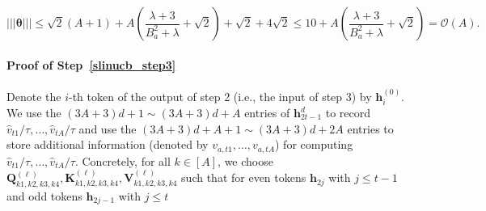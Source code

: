 \documentclass[10pt]{article}
\renewcommand{\hat}{\widehat}
\renewcommand{\cO}{\mathcal{O}}
\newcommand{\<}{\left\langle}
\renewcommand{\>}{\right\rangle}
\renewcommand{\bQ}{\mathbf{Q}}
\newcommand{\nrmp}[1]{{\left|\!\left|\!\left|{#1}\right|\!\right|\!\right|}}
\newcommand{\partd}{{d}}
\newcommand{\temp}{{\tau}}
\def\bK{{\mathbf K}}
\def\bQ{{\mathbf Q}}
\def\bV{{\mathbf V}}
\def\btheta{{\boldsymbol \theta}}
\def\bh{{\mathbf h}}
\begin{document}
$$
\nrmp{\btheta}\leq \sqrt{2}(A+1)+A(\frac{\lambda+3}{B_a^2+\lambda}+\sqrt{2})+\sqrt{2}+4\sqrt{2}\leq 10+A(\frac{\lambda+3}{B_a^2+\lambda}+\sqrt{2})=\cO(A).$$
\paragraph{Proof of Step~\ref{slinucb_step3}}
Denote the $i$-th token  of the output of step 2 (i.e., the input of step 3) by $\bh_i^{(0)}$.
We use the $(3A+3)d+1\sim (3A+3)d+A $ entries of $\bh_{2t-1}^{\partd}$ to record $\hat v_{t1}/\temp,\ldots,\hat v_{tA}/\temp$ and  use the $(3A+3)d+A+1\sim (3A+3)d+2A $ entries to store additional information (denoted by $ v_{a,t1},\ldots, v_{a,tA}$) for computing $ \hat v_{t1}/\temp,\ldots, \hat  v_{tA}/\temp$. Concretely, for all $k\in[A]$, we choose
$\bQ_{k1,k2,k3,k4}^{(\ell)},\bK_{k1,k2,k3,k4}^{(\ell)},\bV_{k1,k2,k3,k4}^{(\ell)}$ such that   for even tokens $\bh_{2j}$ with $j\leq t-1$ and odd tokens $\bh_{2j-1}$ with $j\leq t$
\end{document}
